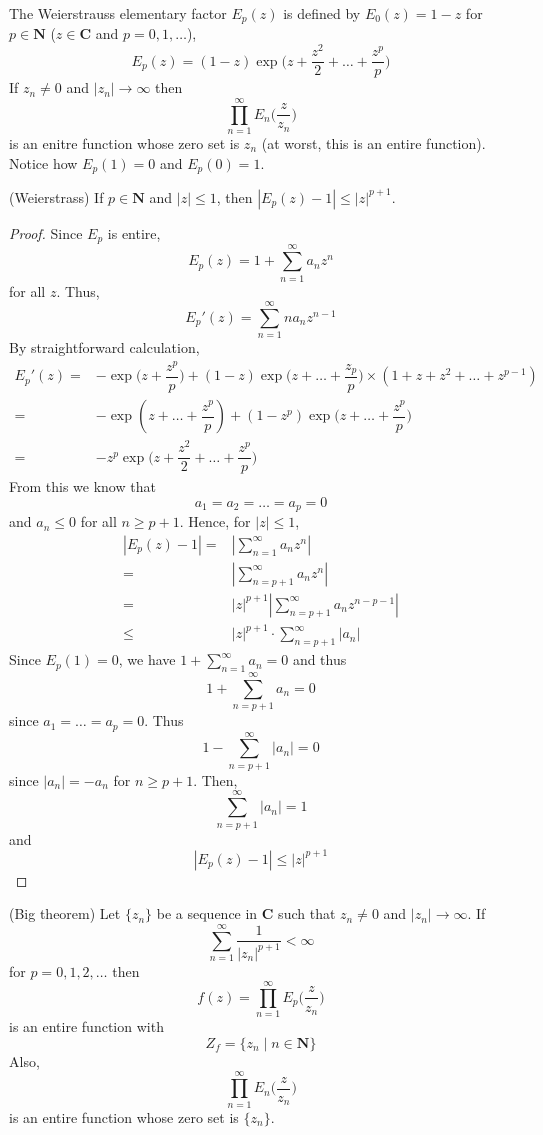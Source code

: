 \vspace{2ex}
\begin{defi}
The Weierstrauss elementary factor $E_{p}(z)$ is defined by $E_{0}(z)=1-z$ for $p\in {\bm N}$ ($z\in {\bm C}$ and $p=0,1,\ldots $),
\[E_{p}(z)=(1-z)\exp \Big(z+\dfrac{z^2}{2}+\ldots +\dfrac{z^{p}}{p}\Big)\]
If $z_{n}\ne 0$ and $|z_{n}|\rightarrow \infty $ then
\[\prod^{\infty }_{n=1}E_{n}\Big(\dfrac{z}{z_{n}}\Big)\]
is an enitre function whose zero set is $z_{n}$ (at worst, this is an entire function). Notice how $E_{p}(1)=0$ and $E_{p}(0)=1$. 
\end{defi}
\vspace{2ex}
\begin{lem}
(Weierstrass) If $p\in {\bm N}$ and $|z|\leq 1$, then $|E_{p}(z)-1|\leq |z|^{p+1}$.
\end{lem}
\vspace{2ex}
\begin{proof}
Since $E_{p}$ is entire, 
\[E_{p}(z)=1+\sum ^{\infty }_{n=1}a_{n}z^{n}\]
for all $z$. Thus,
\[E_{p}'(z)=\sum ^{\infty }_{n=1}na_{n}z^{n-1}\]
By straightforward calculation,
\[\begin{align*}
E_{p}'(z)=&-\exp \Big(z+\dfrac{z^{p}}{p}\Big)+(1-z)\exp \Big(z+\ldots +\dfrac{z_{p}}{p}\Big)\times (1+z+z^2+\ldots +z^{p-1})\\
=&-\exp (z+\ldots +\dfrac{z^{p}}{p})+(1-z^{p})\exp \Big(z+\ldots +\dfrac{z^{p}}{p}\Big)\\
=&-z^{p}\exp \Big(z+\dfrac{z^2}{2}+\ldots +\dfrac{z^{p}}{p}\Big)
\end{align*}\]
From this we know that
\[a_1=a_2=\ldots =a_{p}=0\]
and $a_{n}\leq 0$ for all $n\geq p+1$. Hence, for $|z|\leq 1$,
\[\begin{align*}
|E_{p}(z)-1|=&|\sum ^{\infty }_{n=1}a_{n}z^{n}|\\
=&|\sum ^{\infty }_{n=p+1}a_{n}z^{n}|\\
=&|z|^{p+1}|\sum ^{\infty }_{n=p+1}a_{n}z^{n-p-1}|\\
\leq&|z|^{p+1}\cdot \sum ^{\infty }_{n=p+1}|a_{n}|
\end{align*}\]
Since $E_{p}(1)=0$, we have $1+\sum ^{\infty }_{n=1}a_{n}=0$ and thus
\[1+\sum _{n=p+1}^{\infty }a_{n}=0\]
since $a_1=\ldots =a_{p}=0$. Thus \[1-\sum ^{\infty }_{n=p+1}|a_{n}|=0\]
since $|a_{n}|=-a_{n}$ for $n\geq p+1$. Then,
\[\sum ^{\infty }_{n=p+1}|a_{n}|=1\]
and
\[|E_{p}(z)-1|\leq |z|^{p+1}\]
\end{proof}
\vspace{2ex}
\begin{thm}
(Big theorem) Let $\{z_{n}\}$ be a sequence in ${\bm C}$ such that $z_{n}\ne 0$ and $|z_{n}|\rightarrow \infty $. If 
\[\sum ^{\infty }_{n=1}\dfrac{1}{|z_{n}|^{p+1}}<\infty \]
for $p=0,1,2,\ldots $ then
\[f(z)=\prod^{\infty }_{n=1}E_{p}\Big(\dfrac{z}{z_{n}}\Big)\]
is an entire function with
\[Z_{f}=\{z_{n}\;|\;n\in {\bm N}\}\]
Also, 
\[\prod^{\infty }_{n=1}E_{n}\Big(\dfrac{z}{z_{n}}\Big)\]
is an entire function whose zero set is $\{z_{n}\}$. 
\end{thm}
